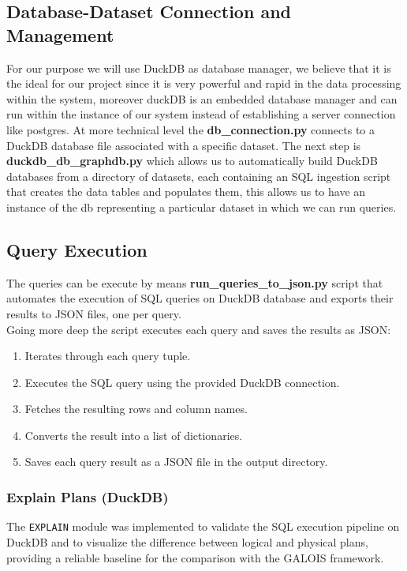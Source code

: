 \documentclass[12pt,a4paper]{article}
\begin{document}
\subsection{Database-Dataset Connection and Management}
For our purpose we will use DuckDB as database manager, we believe that it is the ideal for our project since it is very powerful and rapid in the data processing within the system, moreover duckDB is an embedded database manager and can run within the instance of our system instead of establishing a server connection like postgres.
At more technical level the \textbf{db\_connection.py} connects to a DuckDB database file associated with a specific dataset.
The next step is \textbf{duckdb\_db\_graphdb.py} which allows us to automatically build DuckDB databases from a directory of datasets, each containing an SQL ingestion script that creates the data tables and populates them,  this allows us to have an instance of the db representing a particular dataset  in which we can run queries.

\subsection{Query Execution}
The queries can be execute by means \textbf{run\_queries\_to\_json.py} script that automates the execution of SQL queries on DuckDB database and exports their results to JSON files, one per query.\\
Going more deep the script executes each query and saves the results as JSON:

\begin{enumerate}
    \item Iterates through each query tuple.
    \item Executes the SQL query using the provided DuckDB connection.
    \item Fetches the resulting rows and column names.
    \item Converts the result into a list of dictionaries.
    \item Saves each query result as a JSON file in the output directory.
\end{enumerate}

\subsubsection{Explain Plans (DuckDB)}
\label{sec:explain-plans}

The \texttt{EXPLAIN} module was implemented to validate the SQL execution
pipeline on DuckDB and to visualize the difference between logical and
physical plans, providing a reliable baseline for the comparison with the
GALOIS framework. 
\end{document}
